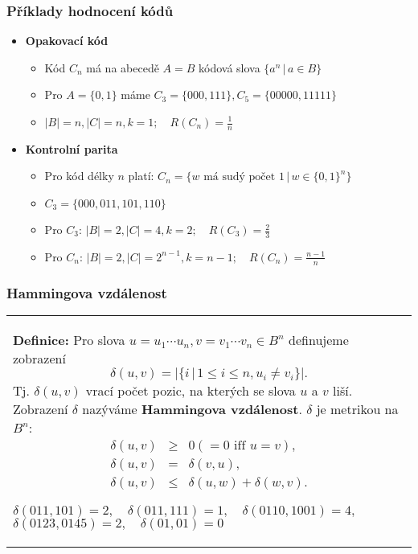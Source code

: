 \documentclass{beamer}
\newenvironment{definice}
{
    \begin{center}
    \begin{tabular}{p{9cm}}
    \textbf{Definice:}
}
{
    \end{tabular}
    \end{center}
}
\newcommand{\sep}{\,|\,}
\newenvironment{itemizex}%
  {\large \begin{itemize}%
    \setlength{\itemsep}{8pt}%
    \setlength{\parskip}{8pt}}%
  {\end{itemize}}
\newenvironment{itemize4}%
  {\large \begin{itemize}%
    \setlength{\itemsep}{4pt}%
    \setlength{\parskip}{4pt}}%
  {\end{itemize}}
\begin{document}
\begin{frame}[t,fragile]\frametitle{Příklady hodnocení kódů} 
    \begin{itemizex}
        \item \textbf{Opakovací kód}
        \begin{itemize4}
            \item Kód $C_n$ má na abecedě $A=B$ kódová slova $\{a^n\sep a\in B\}$
            \item Pro $A=\{0,1\}$ máme $C_3=\{000,111\}, C_5=\{00000,11111\}$
            \item $|B|=n, |C|=n, k=1;\quad R(C_n)=\frac{1}{n}$
        \end{itemize4}
        \item \textbf{Kontrolní parita}
        \begin{itemize4}
            \item Pro kód délky $n$ platí: $C_n=\{w \mbox{ má sudý počet 1}\sep w\in \{0,1\}^n\}$
            \item $C_3=\{000,011,101,110\}$
            \item Pro $C_3$: $|B|=2, |C|=4, k=2;\quad R(C_3)=\frac23$
            \item Pro $C_n$: $|B|=2, |C|=2^{n-1}, k=n-1;\quad R(C_n)=\frac{n-1}{n}$
        \end{itemize4}
    \end{itemizex}
\end{frame}


\begin{frame}[t,fragile]\frametitle{Hammingova vzdálenost} 
    \begin{definice} Pro slova $u=u_1\cdots u_n, v=v_1\cdots v_n\in B^n$ definujeme zobrazení
    $$
    \delta(u,v) = |\{i\sep 1\le i \le n, u_i\ne v_i\}|.
    $$
    Tj. $\delta(u,v)$ vrací počet pozic, na kterých se slova $u$ a $v$ liší. Zobrazení $\delta$ nazýváme \textbf{Hammingova vzdálenost}. $\delta$ je metrikou na $B^n$:
    \begin{eqnarray*}
    \delta(u,v)&\ge&0 (=0 \mbox{ iff } u=v),\\
    \delta(u,v)&=&\delta(v,u),\\
    \delta(u,v)&\le&\delta(u,w)+\delta(w,v).
    \end{eqnarray*}

    $\delta(011,101)=2, \quad \delta(011, 111)=1,\quad \delta(0110, 1001)=4,$ $\delta(0123, 0145)=2, \quad\delta(01,01)=0$
    \end{definice}
\end{frame}
\end{document}
